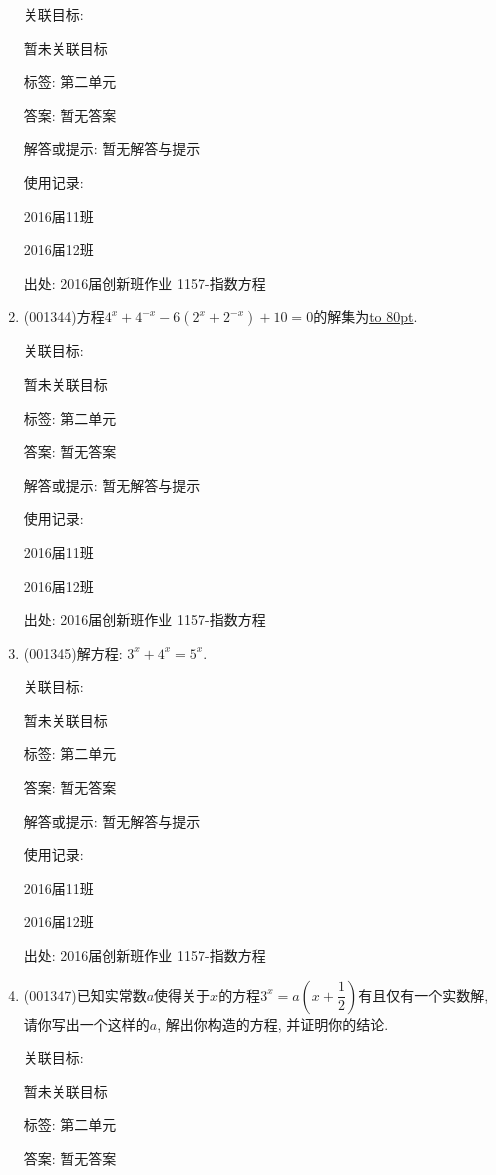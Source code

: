 \documentclass[10pt,a4paper]{article}
\newcommand{\blank}[1]{\underline{\hbox to #1pt{}}}
\begin{document}
\begin{enumerate}[1.]
关联目标:

暂未关联目标



标签: 第二单元

答案: 暂无答案

解答或提示: 暂无解答与提示

使用记录:

2016届11班	

2016届12班	


出处: 2016届创新班作业	1157-指数方程
\item { (001344)}方程$4^x+4^{-x}-6(2^x+2^{-x})+10=0$的解集为\blank{80}.


关联目标:

暂未关联目标



标签: 第二单元

答案: 暂无答案

解答或提示: 暂无解答与提示

使用记录:

2016届11班	

2016届12班	


出处: 2016届创新班作业	1157-指数方程
\item { (001345)}解方程: $3^x+4^x=5^x$.


关联目标:

暂未关联目标



标签: 第二单元

答案: 暂无答案

解答或提示: 暂无解答与提示

使用记录:

2016届11班	

2016届12班	


出处: 2016届创新班作业	1157-指数方程
\item { (001347)}已知实常数$a$使得关于$x$的方程$3^x=a\left(x+\dfrac{1}{2}\right)$有且仅有一个实数解, 请你写出一个这样的$a$, 解出你构造的方程, 并证明你的结论.


关联目标:

暂未关联目标



标签: 第二单元

答案: 暂无答案


\end{enumerate}
\end{document}
